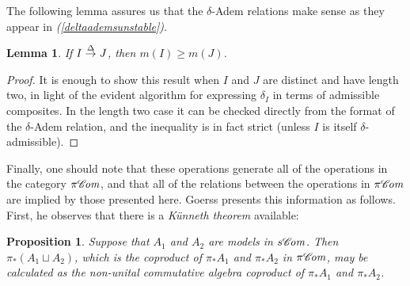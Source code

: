 \documentclass[11pt]{amsart} \renewcommand{\baselinestretch}{1.2}
\theoremstyle{plain}
\newtheorem{lem}[thm]{Lemma}
\newtheorem{prop}[thm]{Proposition}
\numberwithin{equation}{section} %
\theoremstyle{plain}
\newtheorem{lem}[thm]{Lemma}
\newtheorem{prop}[thm]{Proposition}
\numberwithin{equation}{chapter} %
\renewcommand{\to}{\longrightarrow}
\newcommand{\scrC}{\mathscr{C}}
\newcommand{\citeBOX}[2][]{\cite[\mbox{#1}]{#2}}
\newcommand{\deltaalg}{\Delta} %
\newcommand{\PA}[1]{\pi#1}
\newcommand{\minDimDelta}{m}
\newcommand{\produces}[3]{#3:#1\sim #2}
\renewcommand{\produces}[3]{#1\rightarrow_{#3} #2}%
\renewcommand{\produces}[3]{#1\overset{\smash{#3}}{\rightarrow} #2}%
\newcommand{\algs}{{\scrC\!\textit{\normalfont\textit{om}}}}
\begin{document}
\begin{Constructing homotopy operations}
The following lemma assures us that the $\delta$-Adem relations make sense as they appear in \emph{(\ref{deltaademsunstable})}.
\begin{lem}
\label{lemOnAdemChangeInMDeltaPlain}
If $\produces{I}{J}{\deltaalg}$, then $\minDimDelta(I)\geq\minDimDelta(J)$.
\end{lem}
\begin{proof}
It is enough to show this result when $I$ and $J$ are distinct and have length two, in light of the evident algorithm for expressing $\delta_I$ in terms of admissible composites. In the length two case it can be checked directly from the format of the $\delta$-Adem relation, and the inequality is in fact strict (unless $I$ is itself $\delta$-admissible).
\end{proof}
Finally, one should note that these operations generate all of the operations in the category $\PA{\algs}$, and that all of the relations between the operations in $\PA{\algs}$ are implied by those presented here. Goerss \citeBOX[\S2]{MR1089001} presents this information as follows. First, he observes that there is a \emph{K\"unneth theorem} available:
\begin{prop}
\label{salgs homotopy kunneth}
Suppose that $A_1$ and $A_2$ are models in $s\algs$. Then $\pi_*(A_1\sqcup A_2)$, which is the coproduct of $\pi_*A_1$ and $\pi_*A_2$ in $\PA{\algs}$, may be calculated as the non-unital commutative algebra coproduct of $\pi_*A_1$ and $\pi_*A_2$.
\end{prop}

\end{Constructing homotopy operations}
\end{document}
